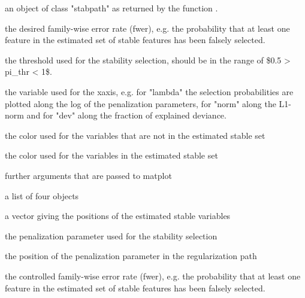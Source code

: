 \documentclass[letterpaper]{book}
\begin{document}
%
\begin{Arguments}
\begin{ldescription}
\item[\code{x}] 
an object of class "stabpath" as returned by the function .

\item[\code{fwer}] 
the desired family-wise error rate (fwer), e.g. the probability that at least one feature in the estimated set of stable features has been falsely selected. 

\item[\code{pi\_thr}] 
the threshold used for the stability selection, should be in the range of \$0.5 > pi\_thr < 1\$.  

\item[\code{xvar}] 
the variable used for the xaxis, e.g. for "lambda" the selection probabilities are plotted along the log of the penalization parameters,
for "norm" along the L1-norm and for "dev" along the fraction of explained deviance.

\item[\code{col.all}] 
the color used for the variables that are not in the estimated stable set   

\item[\code{col.sel}] 
the color used for the variables in the estimated stable set

\item[\code{...}] 
further arguments that are passed to matplot

\end{ldescription}
\end{Arguments}
%
\begin{Value}
a list of four objects
\begin{ldescription}
\item[\code{stable}] 
a vector giving the positions of the estimated stable variables 

\item[\code{lambda}] 
the penalization parameter used for the stability selection 

\item[\code{lpos}] 
the position of the penalization parameter in the regularization path

\item[\code{fwer}] 
the controlled family-wise error rate (fwer), e.g. the probability that at least one feature in the estimated set of stable features     has been falsely selected.

\end{ldescription}
\end{Value}
\end{document}
